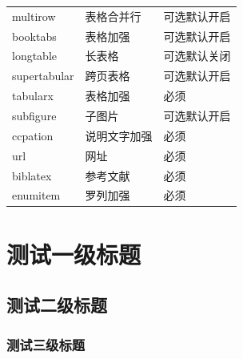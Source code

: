 \documentclass[twoside,maketable]{cauthesis}
\begin{document}
\begin{center}
\begin{supertabular}{lll}
            multirow&表格合并行&可选默认开启\\
            booktabs&表格加强&可选默认开启\\
            longtable&长表格&可选默认关闭\\
            supertabular&跨页表格&可选默认开启\\
            tabularx&表格加强&必须\\
            subfigure&子图片&可选默认开启\\
            \hline
            ccpation&说明文字加强&必须\\
            url&网址&必须\\
            biblatex&参考文献&必须\\
            enumitem&罗列加强&必须\\
            \hline
        \end{supertabular}
    \end{center}
    
    \section{测试一级标题}
    \subsection{测试二级标题}
    \subsubsection{测试三级标题}

    \printbibliography%
\end{document}
